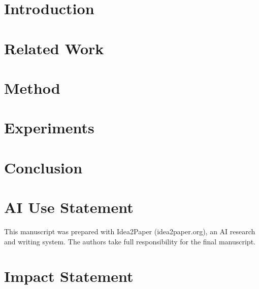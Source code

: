 \documentclass{article}
\begin{document}

\printAffiliationsAndNotice{}

\begin{abstract}
Abstract text goes here.
\end{abstract}

\section{Introduction}

\section{Related Work}

\section{Method}

\section{Experiments}

\section{Conclusion}

\section*{AI Use Statement}
This manuscript was prepared with Idea2Paper (idea2paper.org), an AI research and writing system. The authors take full responsibility for the final manuscript.

\section*{Impact Statement}



\end{document}
